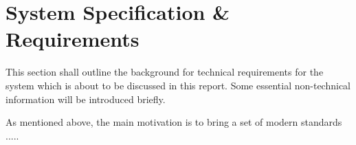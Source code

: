\section{System Specification \& Requirements}

   This section shall outline the background for technical
 requirements for the system which is about to be discussed
 in this report. Some essential non-technical information
 will be introduced briefly.

  As mentioned above, the main motivation is to bring a set
 of modern standards .....


  
